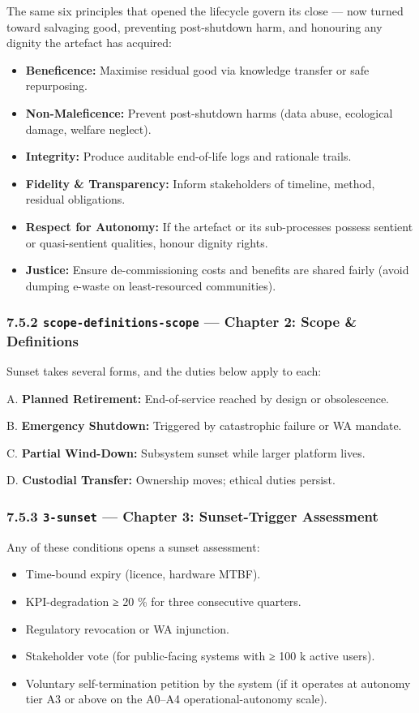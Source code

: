 \documentclass[11pt]{article}
\begin{document}
The same six principles that opened the lifecycle govern its close — now turned toward salvaging good, preventing post-shutdown harm, and honouring any dignity the artefact has acquired:


\begin{itemize}\setlength\itemsep{0pt}
\item \textbf{Beneficence:} Maximise residual good via knowledge transfer or safe repurposing.
\item \textbf{Non-Maleficence:} Prevent post-shutdown harms (data abuse, ecological damage, welfare neglect).
\item \textbf{Integrity:} Produce auditable end-of-life logs and rationale trails.
\item \textbf{Fidelity \& Transparency:} Inform stakeholders of timeline, method, residual obligations.
\item \textbf{Respect for Autonomy:} If the artefact or its sub-processes possess sentient or quasi-sentient qualities, honour dignity rights.
\item \textbf{Justice:} Ensure de-commissioning costs and benefits are shared fairly (avoid dumping e-waste on least-resourced communities).
\end{itemize}


\subsubsection*{7.5.2 \texttt{scope-definitions-scope} — Chapter 2: Scope \& Definitions}


Sunset takes several forms, and the duties below apply to each:


A. \textbf{Planned Retirement:} End-of-service reached by design or obsolescence.

B. \textbf{Emergency Shutdown:} Triggered by catastrophic failure or WA mandate.

C. \textbf{Partial Wind-Down:} Subsystem sunset while larger platform lives.

D. \textbf{Custodial Transfer:} Ownership moves; ethical duties persist.


\subsubsection*{7.5.3 \texttt{3-sunset} — Chapter 3: Sunset-Trigger Assessment}


Any of these conditions opens a sunset assessment:


\begin{itemize}\setlength\itemsep{0pt}
\item Time-bound expiry (licence, hardware MTBF).
\item KPI-degradation ≥ 20 \% for three consecutive quarters.
\item Regulatory revocation or WA injunction.
\item Stakeholder vote (for public-facing systems with ≥ 100 k active users).
\item Voluntary self-termination petition by the system (if it operates at autonomy tier A3 or above on the A0–A4 operational-autonomy scale).
\end{itemize}
\end{document}
